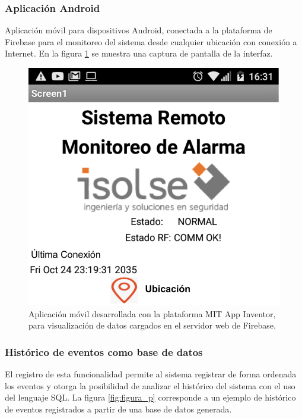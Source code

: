 \subsubsection{Aplicación Android}
Aplicación móvil para dispositivos Android, conectada a la plataforma de Firebase para el monitoreo del sistema desde cualquier ubicación con conexión a Internet. En la figura \ref{fig:figura_n} se muestra una captura de pantalla de la interfaz.

\begin{figure}[ht]
	\centering
	\includegraphics[scale=.35]{./Figures/Capitulo4/Figura_N.png}
	\caption{Aplicación móvil desarrollada con la plataforma MIT App Inventor, para visualización de datos cargados en el servidor web de Firebase.}
	\label{fig:figura_n}
\end{figure}

\subsubsection{Histórico de eventos como base de datos}
El registro de esta funcionalidad permite al sistema registrar de forma ordenada los eventos y otorga la posibilidad de analizar el histórico del sistema con el uso del lenguaje SQL. La figura \ref{fig:figura_p} corresponde a un ejemplo de histórico de eventos registrados a partir de una base de datos generada.

\break


